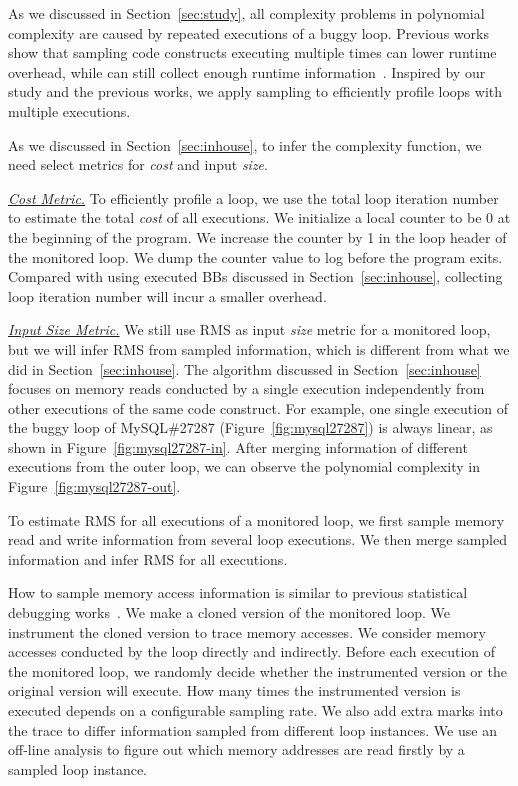 As we discussed in Section~\ref{sec:study}, 
all complexity problems in polynomial complexity 
are caused by repeated executions of a buggy loop.
Previous works show that sampling code constructs 
executing multiple 
times can lower runtime overhead, 
while can still collect enough runtime information~\cite{SongOOPSLA2014,ldoctor}. 
Inspired by our study and the previous works, 
we apply sampling to efficiently profile loops with multiple executions. 
 

As we discussed in Section~\ref{sec:inhouse}, 
to infer the complexity function, 
we need select metrics for \textit{cost} and input \textit{size}.

{\underline{\textit{Cost Metric.}}
To efficiently profile a loop, we use the total loop iteration number 
to estimate the total \textit{cost} of all executions.
We initialize a local counter to be 0 at the beginning of the program.
We increase the counter by 1 in the loop header of the monitored loop.
We dump the counter value to log before the program exits. 
Compared with using executed BBs discussed in Section~\ref{sec:inhouse}, 
collecting loop iteration number will incur a smaller overhead.   


{\underline{\textit{Input Size Metric.}}
We still use RMS as input \textit{size} metric for a monitored loop, 
but we will infer RMS from sampled information, 
which is different from what we did in Section~\ref{sec:inhouse}.
The algorithm discussed in Section~\ref{sec:inhouse} 
focuses on memory reads conducted by a single execution 
independently from other executions 
of the same code construct. 
For example, one single execution of 
the buggy loop of MySQL\#27287 (Figure~\ref{fig:mysql27287})
is always linear, as shown in Figure~\ref{fig:mysql27287-in}.
After merging information of different executions from the outer loop,
we can observe the polynomial complexity 
in Figure~\ref{fig:mysql27287-out}.

To estimate RMS for all executions of a monitored loop, 
we first sample memory read and write information 
from several loop executions. 
We then merge sampled information and 
infer RMS for all executions. 

How to sample memory access information is similar to previous 
statistical debugging works~\cite{liblit03,liblit05,CCI,SongOOPSLA2014,ldoctor}.
We make a cloned version of the monitored loop.
We instrument the cloned version to trace memory accesses.
We consider memory accesses conducted by the loop directly
and indirectly. 
Before each execution of the monitored loop, 
we randomly decide whether the instrumented version 
or the original version will execute. 
How many times the instrumented version is executed 
depends on a configurable sampling rate. 
We also add extra marks into the trace to 
differ information sampled from different loop instances. 
We use an off-line analysis to figure out which 
memory addresses are read firstly by a sampled loop instance. 


}}

